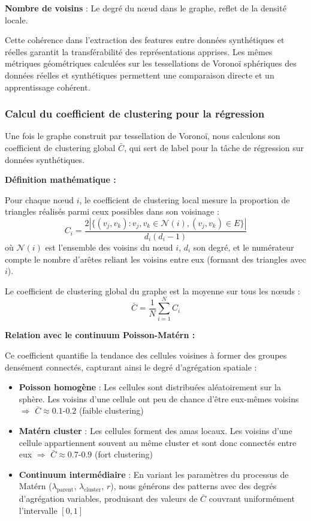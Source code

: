 \textbf{Nombre de voisins} : Le degré du nœud dans le graphe, reflet de la densité locale.

Cette cohérence dans l'extraction des features entre données synthétiques et réelles garantit la transférabilité des représentations apprises. Les mêmes métriques géométriques calculées sur les tessellations de Voronoï sphériques des données réelles et synthétiques permettent une comparaison directe et un apprentissage cohérent.

\subsubsection{Calcul du coefficient de clustering pour la régression}

Une fois le graphe construit par tessellation de Voronoï, nous calculons son coefficient de clustering global $\bar{C}$, qui sert de label pour la tâche de régression sur données synthétiques.

\textbf{Définition mathématique :}

Pour chaque nœud $i$, le coefficient de clustering local mesure la proportion de triangles réalisés parmi ceux possibles dans son voisinage :
\[
C_i = \frac{2|\{(v_j, v_k) : v_j, v_k \in \mathcal{N}(i), (v_j, v_k) \in E\}|}{d_i(d_i-1)}
\]
où $\mathcal{N}(i)$ est l'ensemble des voisins du nœud $i$, $d_i$ son degré, et le numérateur compte le nombre d'arêtes reliant les voisins entre eux (formant des triangles avec $i$).

Le coefficient de clustering global du graphe est la moyenne sur tous les nœuds :
\[
\bar{C} = \frac{1}{N}\sum_{i=1}^N C_i
\]

\textbf{Relation avec le continuum Poisson-Matérn :}

Ce coefficient quantifie la tendance des cellules voisines à former des groupes densément connectés, capturant ainsi le degré d'agrégation spatiale :

\begin{itemize}
    \item \textbf{Poisson homogène} : Les cellules sont distribuées aléatoirement sur la sphère. Les voisins d'une cellule ont peu de chance d'être eux-mêmes voisins $\Rightarrow$ $\bar{C} \approx 0.1$-$0.2$ (faible clustering)
    
    \item \textbf{Matérn cluster} : Les cellules forment des amas locaux. Les voisins d'une cellule appartiennent souvent au même cluster et sont donc connectés entre eux $\Rightarrow$ $\bar{C} \approx 0.7$-$0.9$ (fort clustering)
    
    \item \textbf{Continuum intermédiaire} : En variant les paramètres du processus de Matérn ($\lambda_{\text{parent}}$, $\lambda_{\text{cluster}}$, $r$), nous générons des patterns avec des degrés d'agrégation variables, produisant des valeurs de $\bar{C}$ couvrant uniformément l'intervalle $[0, 1]$
\end{itemize}

